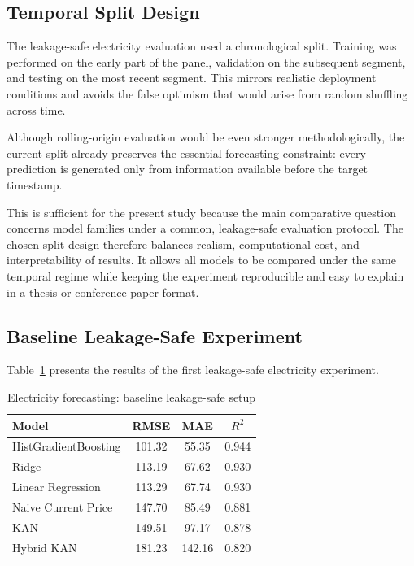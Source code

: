 \documentclass[10pt,conference,onecolumn]{IEEEtran}
\begin{document}
\subsection{Temporal Split Design}

The leakage-safe electricity evaluation used a chronological split. Training was performed on the early part of the panel, validation on the subsequent segment, and testing on the most recent segment. This mirrors realistic deployment conditions and avoids the false optimism that would arise from random shuffling across time.

Although rolling-origin evaluation would be even stronger methodologically, the current split already preserves the essential forecasting constraint: every prediction is generated only from information available before the target timestamp.

This is sufficient for the present study because the main comparative question concerns model families under a common, leakage-safe evaluation protocol. The chosen split design therefore balances realism, computational cost, and interpretability of results. It allows all models to be compared under the same temporal regime while keeping the experiment reproducible and easy to explain in a thesis or conference-paper format.

\subsection{Baseline Leakage-Safe Experiment}

Table~\ref{tab:elec_base} presents the results of the first leakage-safe electricity experiment.

\begin{table}[t]
\centering
\caption{Electricity forecasting: baseline leakage-safe setup}
\label{tab:elec_base}
\small
\begin{tabular}{lccc}
\toprule
Model & RMSE & MAE & $R^2$ \\
\midrule
HistGradientBoosting & 101.32 & 55.35 & 0.944 \\
Ridge & 113.19 & 67.62 & 0.930 \\
Linear Regression & 113.29 & 67.74 & 0.930 \\
Naive Current Price & 147.70 & 85.49 & 0.881 \\
KAN & 149.51 & 97.17 & 0.878 \\
Hybrid KAN & 181.23 & 142.16 & 0.820 \\
\bottomrule
\end{tabular}
\end{table}
\end{document}
